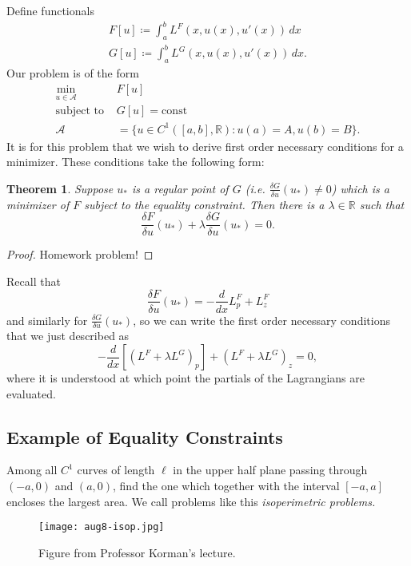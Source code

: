 \documentclass[11pt]{book}
\newcommand{\R}{\mathbb{R}}
\newtheorem{theorem}{Theorem}[subsection]
\begin{document}
Define functionals
\begin{align*}
F[u] \coloneqq \int_a^b L^F(x, u(x), u'(x)) \, dx \\
G[u] \coloneqq \int_a^b L^G(x, u(x), u'(x)) \, dx.
\end{align*}
Our problem is of the form
\begin{align*}
\min_{u \in \mathcal{A}} \qquad &F[u] \\
\text{subject to } &G[u] = \mathrm{const} \\
\mathcal{A} &= \{ u \in C^1([a, b], \R) : u(a) = A, u(b) = B \}.
\end{align*}
It is for this problem that we wish to derive first order necessary conditions for a minimizer. These conditions take the following form:
\begin{theorem}
Suppose $u_*$ is a \emph{regular point} of $G$ (i.e. $\frac{\delta G}{\delta u}(u_*) \neq 0$) which is a minimizer of $F$ subject to the equality constraint. Then there is a $\lambda \in \R$ such that
\[
\frac{\delta F}{\delta u}(u_*) + \lambda \frac{\delta G}{\delta u}(u_*) = 0.
\]
\end{theorem}
\begin{proof}
Homework problem!
\end{proof}

Recall that
\[
\frac{\delta F}{\delta u}(u_*) = -\frac{d}{dx} L_p^F + L_z^F
\]
and similarly for $\frac{\delta G}{\delta u}(u_*)$, so we can write the first order necessary conditions that we just described as
\[
-\frac{d}{dx} \left[ (L^F + \lambda L^G)_p \right] + \left( L^F + \lambda L^G \right)_z = 0,
\]
where it is understood at which point the partials of the Lagrangians are evaluated.

\subsection{Example of Equality Constraints}

Among all $C^1$ curves of length $\ell$ in the upper half plane passing through $(-a,0)$ and $(a, 0)$, find the one which together with the interval $[-a,a]$ encloses the largest area. We call problems like this \emph{isoperimetric problems.}

\begin{figure}[H]
\texttt{[image: aug8-isop.jpg]}
\centering
\caption{Figure from Professor Korman's lecture.}
\end{figure}
\end{document}
